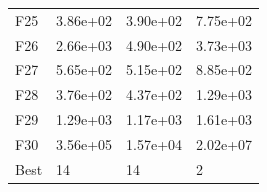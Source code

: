 \begin{table}[H]
\begin{minipage}{.5\linewidth}
\begin{tabular}{llll}
            F25  &  3.86e+02 &  3.90e+02 &  7.75e+02 \\
            F26  &  2.66e+03 &  4.90e+02 &  3.73e+03 \\
            F27  &  5.65e+02 &  5.15e+02 &  8.85e+02 \\
            F28  &  3.76e+02 &  4.37e+02 &  1.29e+03 \\
            F29  &  1.29e+03 &  1.17e+03 &  1.61e+03 \\
            F30  &  3.56e+05 &  1.57e+04 &  2.02e+07 \\
            Best &        14 &        14 &         2 \\
            \bottomrule
            \end{tabular}
            
    \end{minipage} 
\end{table}


